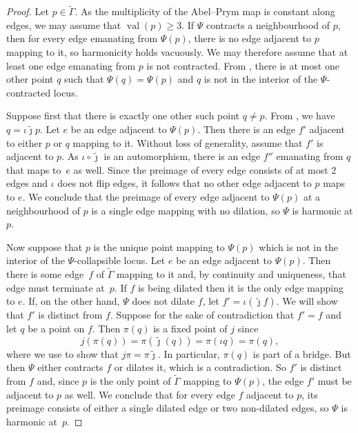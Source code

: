 \documentclass[11pt]{article}
\theoremstyle{definition}
\numberwithin{equation}{section}
\theoremstyle{definition}
\newcommand{\tj}{\widetilde{\jmath}}
\newcommand{\wt}[1]{\widetilde{#1}}
\DeclareMathOperator{\val}{val}
\begin{document}
    \begin{proof}

Let $p\in\wt\Gamma$.
     As the multiplicity of the Abel--Prym map is constant along edges, we may assume that $\val(p)\geq 3$.
If $\Psi$ contracts a neighbourhood of $p$, then for every edge emanating from $\Psi(p)$, there is no edge adjacent to $p$ mapping to it, so harmonicity holds vacuously. We may therefore assume that at least one edge emanating from $p$ is not contracted. From , there is at most one other point $q$ such that $\Psi(q) = \Psi(p)$ and $q$ is not in the interior of the $\Psi$-contracted locus.
    
Suppose first that there is exactly one other such point $q\neq p$. From , we have $q = \iota\tj p$. 
Let $e$ be an edge adjacent to $\Psi(p)$. Then there is an edge $f'$ adjacent to either $p$ or $q$ mapping to it. Without loss of generality, assume that $f'$ is adjacent to $p$. As $\iota\circ\tj$ is an automorphism, there is an edge $f''$ emanating from $q$  that maps to~$e$ as well.
Since  the preimage of every edge consists of at most 2 edges and $\iota$ does not flip edges, 
it follows that no other edge adjacent to $p$ maps to $e$.
We conclude that the preimage of every edge adjacent to $\Psi(p)$ at a neighbourhood of $p$ is a single edge mapping with no dilation, so $\Psi$ is harmonic at $p$. 

Now suppose  that $p$ is the unique point  mapping to $\Psi(p)$ which is not in the interior of the $\Psi$-collapsible locus.
Let $e$ be an edge adjacent to $\Psi(p)$. Then there is some edge~$f$ of $\wt\Gamma$ mapping to it and, by continuity and uniqueness, that edge must terminate at~$p$.   If $f$ is being dilated then it is the only edge mapping to $e$. If, on the other hand, 
$\Psi$ does not dilate $f$, let $f' =\iota(\tj f)$. We will show that $f'$ is distinct from $f$. Suppose for the sake of contradiction that $f'=f$ and let $q$ be a point on $f$.   Then $\pi(q)$ is a fixed point of $j$ since 
       \[
       j(\pi(q)) = \pi(\tj (q))  = \pi(\iota q) = \pi(q),
       \]
       where we use  to show that $j\pi = \pi\tj$.
       In particular, $\pi(q)$ is part of a bridge. But then $\Psi$ either contracts $f$ or dilates it, which is a contradiction.  So $f'$ is distinct from $f$ and, since $p$ is the only point of $\wt\Gamma$ mapping to $\Psi(p)$, the edge $f'$ must be adjacent to $p$ as well.
We conclude that for every edge $f$ adjacent to $p$, its preimage consists of either a single dilated edge or two non-dilated edges, so $\Psi$ is harmonic at~$p$. 
\end{proof}
\end{document}
